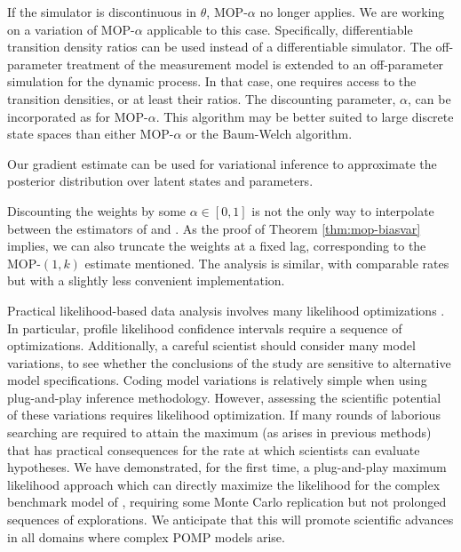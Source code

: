 \documentclass[9pt,twocolumn,pnasresearcharticle]{pnas-new}
\begin{document}
If the simulator is discontinuous in $\theta$, MOP-$\alpha$ no longer applies.
We are working on a variation of MOP-$\alpha$ applicable to this case.
Specifically, differentiable transition density ratios can be used instead of a differentiable simulator.
The off-parameter treatment of the measurement model is extended to an off-parameter simulation for the dynamic process.
In that case, one requires access to the transition densities, or at least their ratios. 
The discounting parameter, $\alpha$, can be incorporated as for MOP-$\alpha$.
This algorithm may be better suited to large discrete state spaces than either MOP-$\alpha$ or the Baum-Welch algorithm.

Our gradient estimate can be used for variational inference to approximate the posterior distribution over latent states \cite{naesseth18} and parameters. 

Discounting the weights by some $\alpha \in [0,1]$ is not the only way to interpolate between the estimators of \cite{naesseth18} and \cite{poyiadjis11}. 
As the proof of Theorem \ref{thm:mop-biasvar} implies, we can also truncate the weights at a fixed lag, corresponding to the MOP-$(1,k)$ estimate mentioned. 
The analysis is similar, with comparable rates but with a slightly less convenient implementation. 

Practical likelihood-based data analysis involves many likelihood optimizations \cite{king08,blake14,pons-salort18,subramanian21,fox22,drake23}.
In particular, profile likelihood confidence intervals require a sequence of optimizations.
Additionally, a careful scientist should consider many model variations, to see whether the conclusions of the study are sensitive to alternative model specifications.
Coding model variations is relatively simple when using plug-and-play inference methodology.
However, assessing the scientific potential of these variations requires likelihood optimization.
If many rounds of laborious searching are required to attain the maximum (as arises in previous methods) that has practical consequences for the rate at which scientists can evaluate hypotheses.
We have demonstrated, for the first time, a plug-and-play maximum likelihood approach which can directly maximize the likelihood for the complex benchmark model of \cite{king08}, requiring some Monte Carlo replication but not prolonged sequences of explorations.
We anticipate that this will promote scientific advances in all domains where complex POMP models arise.
\end{document}
